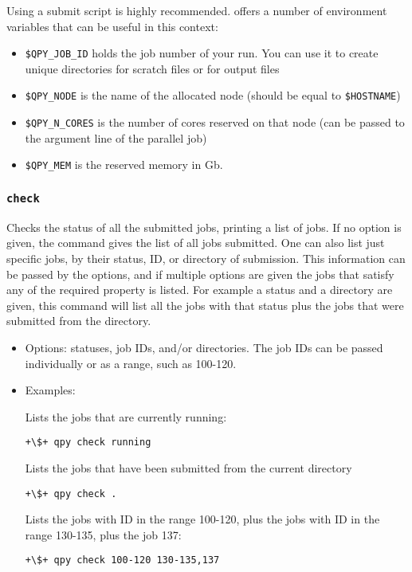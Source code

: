 \documentclass[a4paper,12pt]{article}
\begin{document}
Using a submit script is highly recommended. \qpy{} offers a number of environment variables that can be useful in this context: 
\begin{itemize}
\item \verb+$QPY_JOB_ID+ holds the job number of your run. You can use it to create unique directories for scratch files or for output files
\item \verb+$QPY_NODE+ is the name of the allocated node (should be equal to \verb+$HOSTNAME+)
\item \verb+$QPY_N_CORES+ is the number of cores reserved on that node (can be passed to the argument line of the parallel job)
\item \verb+$QPY_MEM+ is the reserved memory in Gb.
\end{itemize}

  
\subsubsection{\texttt{check}}

Checks the status of all the submitted jobs, printing a list of jobs.
If no option is given, the command gives the list of all jobs submitted.
One can also list just specific jobs, by their status, ID, or directory of submission.
This information can be passed by the options, and if multiple options are given the jobs that satisfy any of the required property is listed.
For example a status and a directory are given, this command will list all the jobs with that status plus the jobs that were submitted from the directory.

\begin{itemize}
  
\item Options:
  statuses, job IDs, and/or directories.
  The job IDs can be passed individually or as a range, such as 100-120.
  
\item Examples:

  Lists the jobs that are currently running:

  \begin{lstlisting}[style=BashStyle]
+\$+ qpy check running
  \end{lstlisting}

  Lists the jobs that have been submitted from the current directory

  \begin{lstlisting}[style=BashStyle]
+\$+ qpy check .
  \end{lstlisting}

  Lists the jobs with ID in the range 100-120, plus the jobs with ID in the range 130-135, plus the job 137:

  \begin{lstlisting}[style=BashStyle]
+\$+ qpy check 100-120 130-135,137
  \end{lstlisting}
\end{itemize}
\end{document}
